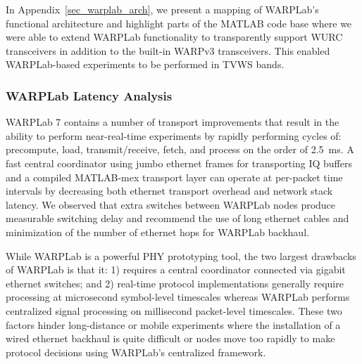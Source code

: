 	In Appendix~\ref{sec_warplab_arch}, we present a mapping of WARPLab's functional architecture and highlight parts of the MATLAB code base where we were able to extend WARPLab functionality to transparently support \ac{WURC} transceivers in addition to the built-in WARPv3 transceivers.
	This enabled WARPLab-based experiments to be performed in \ac{TVWS} bands.
	
\subsubsection{WARPLab Latency Analysis}
\label{sec_warplab_timing}

	WARPLab 7 contains a number of transport improvements that result in the ability to perform near-real-time experiments by rapidly performing cycles of: precompute, load, transmit/receive, fetch, and process on the order of 2.5~ms.
	A fast central coordinator using jumbo ethernet frames for transporting IQ buffers and a compiled MATLAB-mex transport layer can operate at per-packet time intervals by decreasing both ethernet transport overhead and network stack latency.
	We observed that extra switches between WARPLab nodes produce measurable switching delay and recommend the use of long ethernet cables and minimization of the number of ethernet hops for WARPLab backhaul.

	While WARPLab is a powerful \ac{PHY} prototyping tool, the two largest drawbacks of WARPLab is that it: 1) requires a central coordinator connected via gigabit ethernet switches; and 2) real-time protocol implementations generally require processing at microsecond symbol-level timescales whereas WARPLab performs centralized signal processing on millisecond packet-level timescales.
	These two factors hinder long-distance or mobile experiments where the installation of a wired ethernet backhaul is quite difficult or nodes move too rapidly to make protocol decisions using WARPLab's centralized framework.
	
	
%
%
%
%


